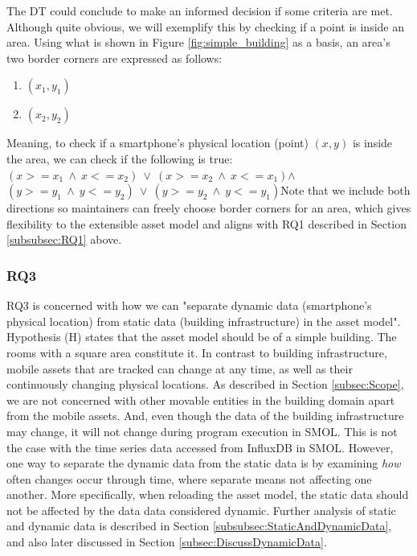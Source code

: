 \documentclass{article}
\begin{document}
The DT could conclude to make an informed decision if some criteria are met. Although quite obvious, we will exemplify this by checking if a point is inside an area. Using what is shown in Figure \ref{fig:simple_building} as a basis, an area's two border corners are expressed as follows:
\begin{enumerate}
    \item $(x_1, y_1)$
    \item $(x_2, y_2)$
\end{enumerate}
Meaning, to check if a smartphone's physical location (point) $(x, y)$ is inside the area, we can check if the following is true:\newline\newline$(x >= x_1\:\land\: x <= x_2)\:\lor\:(x >= x_2\:\land\:x <= x_1)$\newline$\land$\newline$(y >= y_1\:\land\:y <= y_2)\:\lor\:(y >= y_2\:\land\:y <= y_1)$\newline\newline Note that we include both directions so maintainers can freely choose border corners for an area, which gives flexibility to the extensible asset model and aligns with RQ1 described in Section \ref{subsubsec:RQ1} above.

\subsubsection{RQ3}
RQ3 is concerned with how we can "separate dynamic data (smartphone’s physical location) from static data
(building infrastructure) in the asset model". Hypothesis (H) states that the asset model should be of a simple building. The rooms with a square area constitute it. In contrast to building infrastructure, mobile assets that are tracked can change at any time, as well as their continuously changing physical locations. As described in Section \ref{subsec:Scope}, we are not concerned with other movable entities in the building domain apart from the mobile assets. And, even though the data of the building infrastructure may change, it will not change during program execution in SMOL. This is not the case with the time series data accessed from InfluxDB in SMOL. However, one way to separate the dynamic data from the static data is by examining \emph{how} often changes occur through time, where separate means not affecting one another. More specifically, when reloading the asset model, the static data should not be affected by the data data considered dynamic. Further analysis of static and dynamic data is described in Section \ref{subsubsec:StaticAndDynamicData}, and also later discussed in Section \ref{subsec:DiscussDynamicData}.
\end{document}
